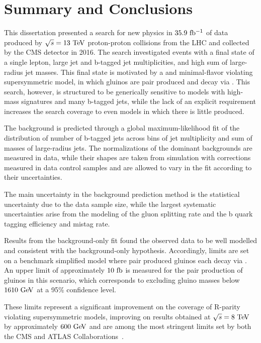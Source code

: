 \chapter{Summary and Conclusions}

This dissertation presented a search for new physics in $35.9~\mathrm{fb^{-1}}$ of data produced by $\sqrt{s} = 13~\mathrm{Te\kern -0.1em V}$ proton-proton collisions from the LHC and collected by the CMS detector in 2016. 
The search investigated events with a final state of a single lepton, large jet and b-tagged jet multiplicities, and high sum of large-radius jet masses.
This final state is motivated by a \RP and minimal-flavor violating supersymmetric model, in which gluinos are pair produced and decay via \rpvDecay.
This search, however, is structured to be generically sensitive to models with high-mass signatures and many b-tagged jets, while the lack of an explicit \MET requirement increases the search coverage to even \RPC models in which there is little \MET produced.

The background is predicted through a global maximum-likelihood fit of the distribution of number of b-tagged jets across bins of jet multiplicity and sum of masses of large-radius jets.
The normalizations of the dominant backgrounds are measured in data, while their shapes are taken from simulation with corrections measured in data control samples and are allowed to vary in the fit according to their uncertainties.

The main uncertainty in the background prediction method is the statistical uncertainty due to the data sample size, while the largest systematic uncertainties arise from the modeling of the gluon splitting rate and the b quark tagging efficiency and mistag rate.

Results from the background-only fit found the observed data to be well modelled and consistent with the background-only hypothesis.
Accordingly, limits are set on a benchmark simplified model where pair produced gluinos each decay via \smsDecay.
An upper limit of approximately $10~\mathrm{fb}$ is measured for the pair production of gluinos in this scenario, which corresponds to excluding gluino masses below $1610~\mathrm{Ge\kern -0.1em V}$ at a 95\% confidence level.

These limits represent a significant improvement on the coverage of R-parity violating supersymmetric models, improving on results obtained at $\sqrt{s} = 8~\mathrm{Te\kern -0.1em V}$~\cite{Khachatryan:2016iqn,Aad:2015lea} by approximately $600~\mathrm{Ge\kern -0.1em V}$ and are among the most stringent limits set by both the CMS and ATLAS Collaborations~\cite{Aaboud:2017faq,Aaboud:2018lpl}.

